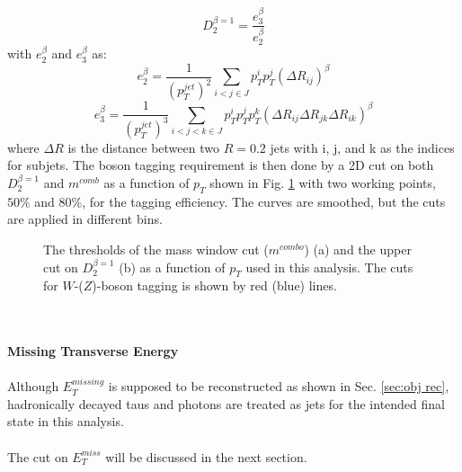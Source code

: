 \begin{equation}
D^{\beta =1}_{2} = \frac{e^{\beta}_{3}}{e^{\beta}_2} 
\end{equation}
with $e^{\beta}_{2}$ and $e^{\beta}_{3}$ as:
\begin{equation}
e^{\beta}_{2} = \frac{1}{(p_{T}^{jet})^2}\displaystyle\sum\limits_{i<j\in J}p_{T}^{i}p_{T}^j(\Delta R_{ij})^{\beta}
\end{equation}
\begin{equation}
e^{\beta}_{3} = \frac{1}{(p_{T}^{jet})^3}\displaystyle\sum\limits_{i<j<k\in J}p_{T}^{i}p_{T}^{j}p_{T}^{k}(\Delta R_{ij}\Delta R_{jk}\Delta R_{ik})^{\beta}
\end{equation}
where $\Delta R$ is the distance between two $R=0.2$ jets with i, j, and k as the indices for subjets. The boson tagging requirement is then done by a 2D cut on both $D^{\beta =1}_{2}$ and $m^{comb}$ as a function of $p_{T}$ shown in Fig. \ref{Fig:newWZtaggerWP} with two working points, $50\%$ and $80\%$, for the tagging efficiency. The curves are smoothed, but the cuts are applied in different bins.
\begin{figure}[ht]
	\begin{center}
		\caption{The thresholds of the mass window cut ($m^{combo}$) (a) and the upper cut on $D^{\beta =1}_2$ (b) as a function of $p_{T}$ used in this analysis. The cuts  for $W$-($Z$)-boson tagging is shown by red (blue) lines.}
		\label{Fig:newWZtaggerWP}
	\end{center}
\end{figure}
\noindent
\\
\\{\bf Missing Transverse Energy}
\\
\\Although $E^{missing}_{T}$ is supposed to be reconstructed as shown in Sec. \ref{sec:obj rec}, hadronically decayed taus and photons are treated as jets for the intended final state in this analysis.
\\
\\The cut on $E^{miss}_{T}$ will be discussed in the next section.   
